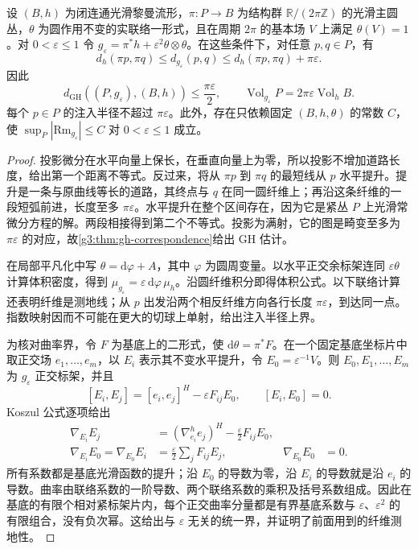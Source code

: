 \begin{proposition}\label{g3:prop:circle-bundle-collapse}
	设 \((B,h)\) 为闭连通光滑黎曼流形，\(\pi:P\to B\) 为结构群 \(\mathbb R/(2\pi\mathbb Z)\) 的光滑主圆丛，\(\theta\) 为圆作用不变的实联络一形式，且在周期 \(2\pi\) 的基本场 \(V\) 上满足 \(\theta(V)=1\)。对 \(0<\varepsilon\le1\) 令 \(g_\varepsilon=\pi^*h+\varepsilon^2\theta\otimes\theta\)。在这些条件下，对任意 \(p,q\in P\)，有
	\begin{equation}\label{g3:eq:circle-bundle-distance-bound}
		d_h(\pi p,\pi q)\le d_{g_\varepsilon}(p,q)
		\le d_h(\pi p,\pi q)+\pi\varepsilon.
	\end{equation}
	因此
	\[
		d_{\mathrm{GH}}((P,g_\varepsilon),(B,h))\le\frac{\pi\varepsilon}{2},
		\qquad \operatorname{Vol}_{g_\varepsilon}P
		=2\pi\varepsilon\operatorname{Vol}_hB.
	\]
	每个 \(p\in P\) 的注入半径不超过 \(\pi\varepsilon\)。此外，存在只依赖固定 \((B,h,\theta)\) 的常数 \(C\)，使 \(\sup_P|\mathrm{Rm}_{g_\varepsilon}|\le C\) 对 \(0<\varepsilon\le1\) 成立。
\end{proposition}
\begin{proof}
	投影微分在水平向量上保长，在垂直向量上为零，所以投影不增加道路长度，给出第一个距离不等式。反过来，将从 \(\pi p\) 到 \(\pi q\) 的最短线从 \(p\) 水平提升。提升是一条与原曲线等长的道路，其终点与 \(q\) 在同一圆纤维上；再沿这条纤维的一段短弧前进，长度至多 \(\pi\varepsilon\)。水平提升在整个区间存在，因为它是紧丛 \(P\) 上光滑常微分方程的解。两段相接得到第二个不等式。投影为满射，它的图是畸变至多为 \(\pi\varepsilon\) 的对应，故\cref{g3:thm:gh-correspondence}给出 GH 估计。

	在局部平凡化中写 \(\theta=\mathrm d\varphi+A\)，其中 \(\varphi\) 为圆周变量。以水平正交余标架连同 \(\varepsilon\theta\) 计算体积密度，得到 \(\mu_{g_\varepsilon}=\varepsilon\,\mathrm d\varphi\,\mu_h\)。沿圆纤维积分即得体积公式。以下联络计算还表明纤维是测地线；从 \(p\) 出发沿两个相反纤维方向各行长度 \(\pi\varepsilon\)，到达同一点。指数映射因而不可能在更大的切球上单射，给出注入半径上界。

	为核对曲率界，令 \(F\) 为基底上的二形式，使 \(\mathrm d\theta=\pi^*F\)。在一个固定基底坐标片中取正交场 \(e_1,\ldots,e_m\)，以 \(E_i\) 表示其不变水平提升，令 \(E_0=\varepsilon^{-1}V\)。则 \(E_0,E_1,\ldots,E_m\) 为 \(g_\varepsilon\) 正交标架，并且
	\[
		[E_i,E_j]=[e_i,e_j]^H-\varepsilon F_{ij}E_0,
		\qquad [E_i,E_0]=0.
	\]
	Koszul 公式逐项给出
	\begin{equation}\label{g3:eq:circle-bundle-connection}
	\begin{aligned}
		\nabla_{E_i}E_j&=(\nabla^h_{e_i}e_j)^H-\tfrac\varepsilon2F_{ij}E_0,\\
		\nabla_{E_i}E_0=\nabla_{E_0}E_i&=\tfrac\varepsilon2\sum_jF_{ij}E_j,
		&\nabla_{E_0}E_0&=0.
	\end{aligned}
	\end{equation}
	所有系数都是基底光滑函数的提升；沿 \(E_0\) 的导数为零，沿 \(E_i\) 的导数就是沿 \(e_i\) 的导数。曲率由联络系数的一阶导数、两个联络系数的乘积及括号系数组成。因此在基底的有限个相对紧标架片内，每个正交曲率分量都是有界基底系数与 \(\varepsilon\)、\(\varepsilon^2\) 的有限组合，没有负次幂。这给出与 \(\varepsilon\) 无关的统一界，并证明了前面用到的纤维测地性。
\end{proof}

